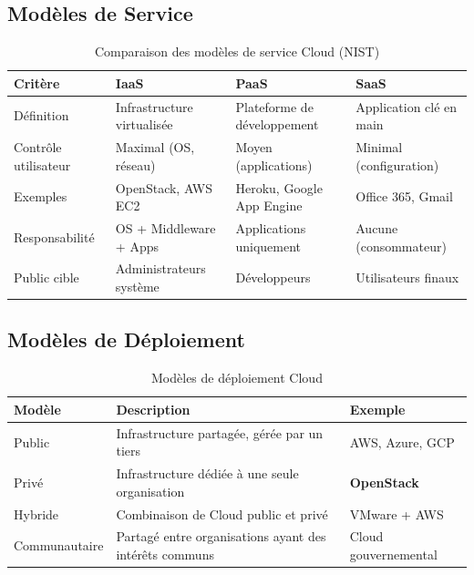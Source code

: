 \documentclass[12pt,a4paper,oneside]{book}
\begin{document}
\subsection{Mod\`eles de Service}

\begin{table}[H]
\centering
\caption{Comparaison des mod\`eles de service Cloud (NIST)}
\begin{tabularx}{\textwidth}{|l|X|X|X|}
\hline
\textbf{Crit\`ere} & \textbf{IaaS} & \textbf{PaaS} & \textbf{SaaS} \\
\hline
D\'efinition & Infrastructure virtualis\'ee & Plateforme de d\'eveloppement & Application cl\'e en main \\
\hline
Contr\^ole utilisateur & Maximal (OS, r\'eseau) & Moyen (applications) & Minimal (configuration) \\
\hline
Exemples & OpenStack, AWS EC2 & Heroku, Google App Engine & Office 365, Gmail \\
\hline
Responsabilit\'e & OS + Middleware + Apps & Applications uniquement & Aucune (consommateur) \\
\hline
Public cible & Administrateurs syst\`eme & D\'eveloppeurs & Utilisateurs finaux \\
\hline
\end{tabularx}
\label{tab:cloud_models}
\end{table}

\subsection{Mod\`eles de D\'eploiement}

\begin{table}[H]
\centering
\caption{Mod\`eles de d\'eploiement Cloud}
\begin{tabularx}{\textwidth}{|l|X|l|}
\hline
\textbf{Mod\`ele} & \textbf{Description} & \textbf{Exemple} \\
\hline
Public & Infrastructure partag\'ee, g\'er\'ee par un tiers & AWS, Azure, GCP \\
\hline
Priv\'e & Infrastructure d\'edi\'ee \`a une seule organisation & \textbf{OpenStack} \\
\hline
Hybride & Combinaison de Cloud public et priv\'e & VMware + AWS \\
\hline
Communautaire & Partag\'e entre organisations ayant des int\'er\^ets communs & Cloud gouvernemental \\
\hline
\end{tabularx}
\label{tab:deploy_models}
\end{table}
\end{document}
